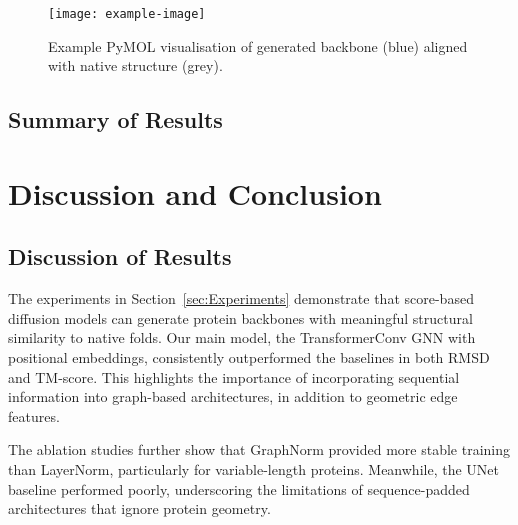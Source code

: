 \documentclass[a4paper,12pt]{article}
\begin{document}
\begin{figure}[htbp]
    \centering
    \texttt{[image: example-image]}
    \caption{Example PyMOL visualisation of generated backbone (blue) aligned with native structure (grey).}
    \label{fig:pymol-example}
\end{figure}

\subsection{Summary of Results}\label{subsec:results-summary}

\clearpage

\section{Discussion and Conclusion}\label{sec:Discussion_and_Conclusion}
\subsection{Discussion of Results}\label{subsec:discussion-results}
The experiments in Section~\ref{sec:Experiments} demonstrate that score-based diffusion models can generate protein backbones with meaningful structural similarity to native folds. Our main model, the TransformerConv GNN with positional embeddings, consistently outperformed the baselines in both RMSD and TM-score. This highlights the importance of incorporating sequential information into graph-based architectures, in addition to geometric edge features. 

The ablation studies further show that GraphNorm provided more stable training than LayerNorm, particularly for variable-length proteins. Meanwhile, the UNet baseline performed poorly, underscoring the limitations of sequence-padded architectures that ignore protein geometry. 
\end{document}
